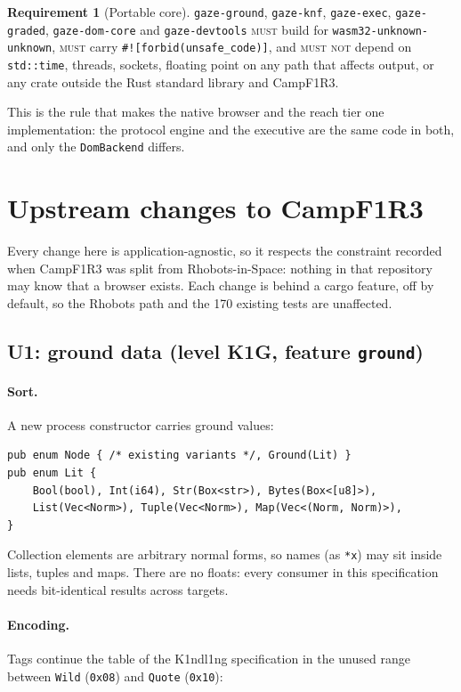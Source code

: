 \documentclass[11pt]{article}
\theoremstyle{definition}
\newtheorem{requirement}{Requirement}
\theoremstyle{remark}
\newcommand{\Camp}{CampF1R3}
\newcommand{\Kind}{K1ndl1ng}
\newcommand{\MUST}{\textsc{must}}
\newcommand{\MUSTNOT}{\textsc{must not}}
\newcommand{\code}[1]{\texttt{#1}}
\begin{document}
\begin{requirement}[Portable core]
\code{gaze-ground}, \code{gaze-knf}, \code{gaze-exec}, \code{gaze-graded},
\code{gaze-dom-core} and \code{gaze-devtools} \MUST{} build for
\code{wasm32-unknown-unknown}, \MUST{} carry \code{\#![forbid(unsafe\_code)]}, and
\MUSTNOT{} depend on \code{std::time}, threads, sockets, floating point on any path
that affects output, or any crate outside the Rust standard library and \Camp{}.
\end{requirement}

\noindent
This is the rule that makes the native browser and the reach tier one
implementation: the protocol engine and the executive are the same code in both,
and only the \code{DomBackend} differs.
\section{Upstream changes to \Camp{}}\label{sec:upstream}

Every change here is application-agnostic, so it respects the constraint recorded
when \Camp{} was split from Rhobots-in-Space: nothing in that repository may know
that a browser exists. Each change is behind a cargo feature, off by default, so the
Rhobots path and the 170 existing tests are unaffected.

\subsection{U1: ground data (level K1G, feature \code{ground})}\label{sec:u-ground}

\paragraph{Sort.} A new process constructor carries ground values:
\begin{lstlisting}[language=RustLite]
pub enum Node { /* existing variants */, Ground(Lit) }
pub enum Lit {
    Bool(bool), Int(i64), Str(Box<str>), Bytes(Box<[u8]>),
    List(Vec<Norm>), Tuple(Vec<Norm>), Map(Vec<(Norm, Norm)>),
}
\end{lstlisting}
Collection elements are arbitrary normal forms, so names (as \code{*x}) may sit
inside lists, tuples and maps. There are no floats: every consumer in this
specification needs bit-identical results across targets.

\paragraph{Encoding.} Tags continue the table of the \Kind{} specification in the
unused range between \code{Wild} (\code{0x08}) and \code{Quote} (\code{0x10}):
\end{document}
